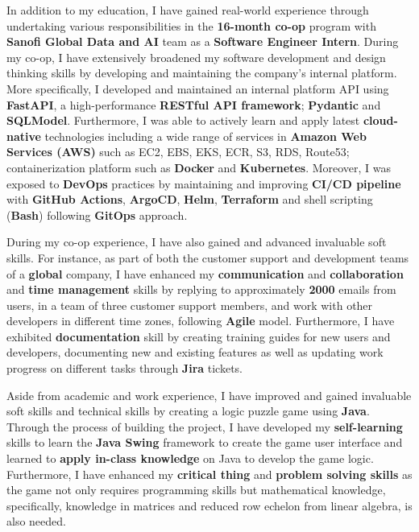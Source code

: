 \documentclass[12pt,letterpaper,sans]{moderncv} %
\begin{document}
In addition to my education, I have gained real-world experience through undertaking various responsibilities in the \textbf{16-month co-op} program with \textbf{Sanofi Global Data and AI} team as a \textbf{Software Engineer Intern}. During my co-op, I have extensively broadened my software development and design thinking skills by developing and maintaining the company's internal platform. More specifically, I developed and maintained an internal platform API using \textbf{FastAPI}, a high-performance \textbf{RESTful API framework}; \textbf{Pydantic} and \textbf{SQLModel}. Furthermore, I was able to actively learn and apply latest \textbf{cloud-native} technologies including a wide range of services in \textbf{Amazon Web Services (AWS)} such as EC2, EBS, EKS, ECR, S3, RDS, Route53; containerization platform such as \textbf{Docker} and \textbf{Kubernetes}. Moreover, I was exposed to \textbf{DevOps} practices by maintaining and improving \textbf{CI/CD pipeline} with \textbf{GitHub Actions}, \textbf{ArgoCD}, \textbf{Helm}, \textbf{Terraform} and shell scripting (\textbf{Bash}) following \textbf{GitOps} approach.

During my co-op experience, I have also gained and advanced invaluable soft skills. For instance, as part of both the customer support and development teams of a \textbf{global} company, I have enhanced my \textbf{communication} and \textbf{collaboration} and \textbf{time management} skills by replying to approximately \textbf{2000} emails from users, in a team of three customer support members, and work with other developers in different time zones, following \textbf{Agile} model. Furthermore, I have exhibited \textbf{documentation} skill by creating training guides for new users and developers, documenting new and existing features as well as updating work progress on different tasks through \textbf{Jira} tickets.

Aside from academic and work experience, I have improved and gained invaluable soft skills and technical skills by creating a logic puzzle game using \textbf{Java}. Through the process of building the project, I have developed my \textbf{self-learning} skills to learn the \textbf{Java Swing} framework to create the game user interface and learned to \textbf{apply in-class knowledge} on Java to develop the game logic. Furthermore, I have enhanced my \textbf{critical thing} and \textbf{problem solving skills} as the game not only requires programming skills but mathematical knowledge, specifically, knowledge in matrices and reduced row echelon from linear algebra, is also needed.
\end{document}
